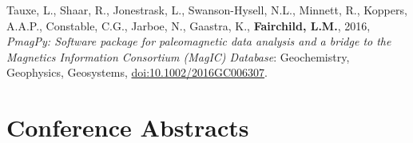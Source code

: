 \documentclass[11pt,a4paper,sans]{moderncv}
\begin{document}
\begin{etaremune}[itemsep=3pt]
    \item{Tauxe, L., Shaar, R., Jonestrask, L., Swanson-Hysell, N.L., Minnett,
            R., Koppers, A.A.P., Constable, C.G., Jarboe, N., Gaastra,  K.,
            \textbf{Fairchild, L.M.}, 2016, \textit{PmagPy: Software package for
                paleomagnetic data analysis and a bridge to the Magnetics
            Information Consortium (MagIC) Database}: Geochemistry,
            Geophysics, Geosystems,
            {\color{cyan}\href{https://doi.org/10.1002/2016GC006307}
        {doi:10.1002/2016GC006307}}.}

\end{etaremune}

\section{Conference Abstracts}
\vspace{6pt}
\end{document}
